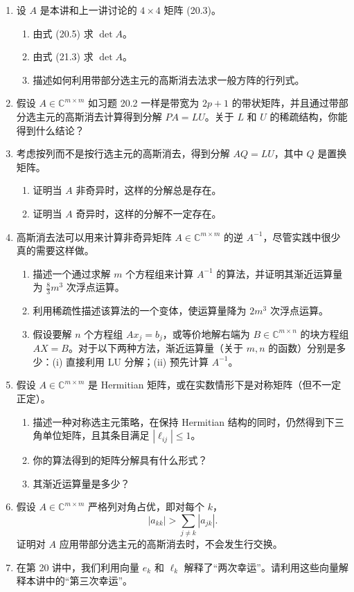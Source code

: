 \documentclass[UTF8,fontset=none,12pt]{ctexart}
\theoremstyle{definition}
\begin{document}
\begin{enumerate}[label=\textbf{21.\arabic*}]
    \item 设 $A$ 是本讲和上一讲讨论的 $4\times4$ 矩阵 (20.3)。
    \begin{enumerate}[label=(\alph*)]
        \item 由式 (20.5) 求 $\det A$。
        \item 由式 (21.3) 求 $\det A$。
        \item 描述如何利用带部分选主元的高斯消去法求一般方阵的行列式。
    \end{enumerate}

    \item 假设 $A\in\mathbb{C}^{m\times m}$ 如习题 20.2 一样是带宽为 $2p+1$ 的带状矩阵，并且通过带部分选主元的高斯消去计算得到分解 $PA=LU$。关于 $L$ 和 $U$ 的稀疏结构，你能得到什么结论？

    \item 考虑按列而不是按行选主元的高斯消去，得到分解 $AQ=LU$，其中 $Q$ 是置换矩阵。
    \begin{enumerate}[label=(\alph*)]
        \item 证明当 $A$ 非奇异时，这样的分解总是存在。
        \item 证明当 $A$ 奇异时，这样的分解不一定存在。
    \end{enumerate}

    \item 高斯消去法可以用来计算非奇异矩阵 $A\in\mathbb{C}^{m\times m}$ 的逆 $A^{-1}$，尽管实践中很少真的需要这样做。
    \begin{enumerate}[label=(\alph*)]
        \item 描述一个通过求解 $m$ 个方程组来计算 $A^{-1}$ 的算法，并证明其渐近运算量为 $\frac83m^3$ 次浮点运算。
        \item 利用稀疏性描述该算法的一个变体，使运算量降为 $2m^3$ 次浮点运算。
        \item 假设要解 $n$ 个方程组 $Ax_j=b_j$，或等价地解右端为 $B\in\mathbb{C}^{m\times n}$ 的块方程组 $AX=B$。对于以下两种方法，渐近运算量（关于 $m,n$ 的函数）分别是多少：(i) 直接利用 LU 分解；(ii) 预先计算 $A^{-1}$。
    \end{enumerate}

    \item 假设 $A\in\mathbb{C}^{m\times m}$ 是 Hermitian 矩阵，或在实数情形下是对称矩阵（但不一定正定）。
    \begin{enumerate}[label=(\alph*)]
        \item 描述一种对称选主元策略，在保持 Hermitian 结构的同时，仍然得到下三角单位矩阵，且其条目满足 $|\ell_{ij}|\le1$。
        \item 你的算法得到的矩阵分解具有什么形式？
        \item 其渐近运算量是多少？
    \end{enumerate}

    \item 假设 $A\in\mathbb{C}^{m\times m}$ 严格列对角占优，即对每个 $k$，
    \begin{equation}
        |a_{kk}|>\sum_{j\ne k}|a_{jk}|.
    \tag{21.11}
    \end{equation}
    证明对 $A$ 应用带部分选主元的高斯消去时，不会发生行交换。

    \item 在第 20 讲中，我们利用向量 $e_k$ 和 $\ell_k$ 解释了“两次幸运”。请利用这些向量解释本讲中的“第三次幸运”。
\end{enumerate}
\end{document}
